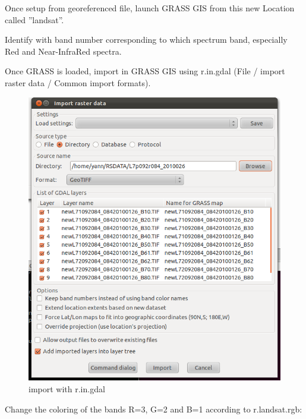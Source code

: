 Once setup from georeferenced file, launch GRASS GIS from this new Location called ''landsat''.

Identify with band number corresponding to which spectrum band, especially Red and Near-InfraRed spectra.

Once GRASS is loaded, import in GRASS GIS using r.in.gdal (File / import raster data / Common import formats).

\begin{figure}[htbp]
   \centering
   \includegraphics[scale=0.35]{grass_rs002.png}
   \caption{import with r.in.gdal}
   \label{fig:grass_rs002}
\end{figure}

Change the coloring of the bands R=3, G=2 and B=1 according to r.landsat.rgb:

